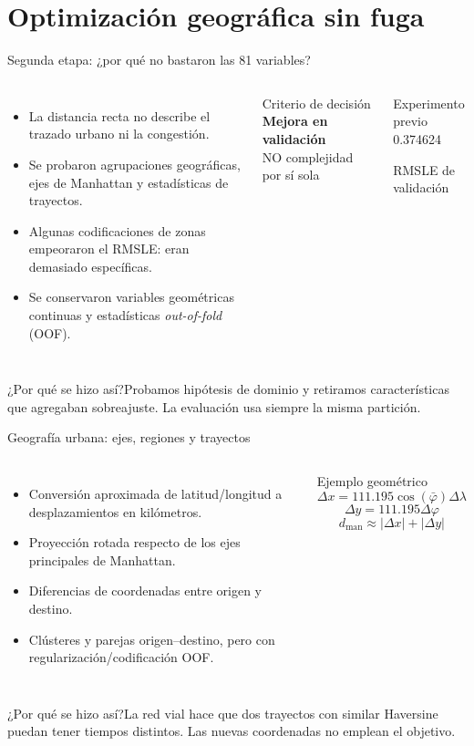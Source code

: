 \documentclass[aspectratio=169,11pt]{beamer}
\newcommand{\porq}[1]{\vspace{1.2mm}\begin{block}{¿Por qué se hizo así?}\small #1\end{block}}
\begin{document}
\section{Optimización geográfica sin fuga}
\begin{frame}{Segunda etapa: ¿por qué no bastaron las 81 variables?}
\begin{columns}[T]
\small
\begin{itemize}
\item La distancia recta no describe el trazado urbano ni la congestión.
\item Se probaron agrupaciones geográficas, ejes de Manhattan y estadísticas de trayectos.
\item Algunas codificaciones de zonas \alert{empeoraron} el RMSLE: eran demasiado específicas.
\item Se conservaron variables geométricas continuas y estadísticas \emph{out-of-fold} (OOF).
\end{itemize}
\begin{block}{Criterio de decisión}\centering
\textbf{Mejora en validación}\\[1mm]
NO complejidad por sí sola
\end{block}
\begin{block}{Experimento previo}
\centering \large 0.374624
\par\small RMSLE de validación\end{block}
\end{columns}
\porq{Probamos hipótesis de dominio y retiramos características que agregaban sobreajuste. La evaluación usa siempre la misma partición.}
\end{frame}

\begin{frame}{Geografía urbana: ejes, regiones y trayectos}
\begin{columns}[T]
\small
\begin{itemize}
\item Conversión aproximada de latitud/longitud a desplazamientos en kilómetros.
\item Proyección rotada respecto de los ejes principales de Manhattan.
\item Diferencias de coordenadas entre origen y destino.
\item Clústeres y parejas origen--destino, pero con regularización/codificación OOF.
\end{itemize}
\begin{block}{Ejemplo geométrico}
\[ \Delta x = 111.195\cos(\bar\varphi)\Delta\lambda\]
\[ \Delta y = 111.195\Delta\varphi \]
\[ d_{\mathrm{man}}\approx |\Delta x|+|\Delta y|\]
\end{block}
\end{columns}
\porq{La red vial hace que dos trayectos con similar Haversine puedan tener tiempos distintos. Las nuevas coordenadas no emplean el objetivo.}
\end{frame}
\end{document}
